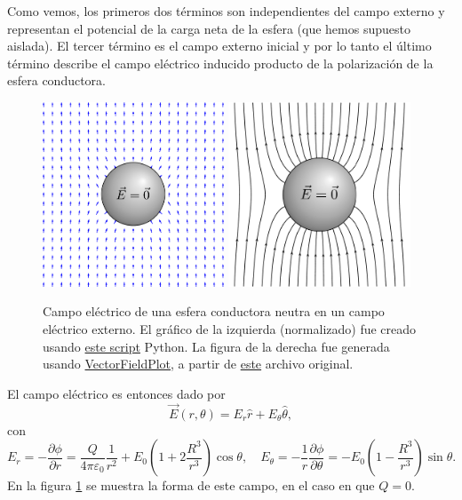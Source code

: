 Como vemos, los primeros dos términos son independientes del campo externo y representan el potencial de la carga neta de la esfera (que hemos supuesto aislada). El tercer término es el campo externo inicial y por lo tanto el último término describe el campo eléctrico inducido producto de la polarización de la esfera conductora.
\begin{figure}[!h]
\centerline{\includegraphics[height=5.5cm]{fig/fig-esfera-conductora-campo-externo.pdf}
\hspace{1cm}
\includegraphics[height=5.5cm]{fig/fig-esfera-conductora-campo-externo-2.pdf}}
\caption{Campo eléctrico de una esfera conductora neutra en un campo eléctrico externo. El gráfico de la izquierda (normalizado) fue creado usando \href{https://github.com/gfrubi/electrodinamica/blob/master/figuras-editables/fig-esfera-conductora-campo-externo-raw.py}{este script} Python. La figura de la derecha fue generada usando \href{http://commons.wikimedia.org/wiki/User:Geek3/VectorFieldPlot}{VectorFieldPlot}, a partir de \href{http://commons.wikimedia.org/wiki/File:VFPt_superconductor_ball_E-field.svg}{este} archivo original.}
\label{fig:ecce}
\end{figure}

El campo eléctrico es entonces dado por
\begin{equation}
\vec{E}(r,\theta) = E_r\hat{r}+E_\theta\hat{\theta},
\end{equation}
con 
\begin{equation}
E_r = -\frac{\partial\phi}{\partial r} = \frac{Q}{4\pi\varepsilon_0}\frac{1}{r^2}+E_0 \left(1+2\frac{R^3}{r^3}\right)\cos\theta, \quad E_\theta = -\frac{1}{r}\frac{\partial\phi}{\partial\theta} =-E_0 \left(1-\frac{R^3}{r^3}\right)\sin\theta .
\end{equation}
En la figura \ref{fig:ecce} se muestra la forma de este campo, en el caso en que $Q=0$.


